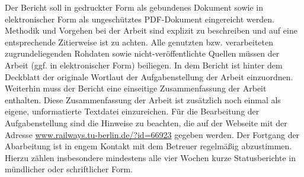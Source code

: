 Der Bericht soll in gedruckter Form als gebundenes Dokument sowie in elektronischer Form als ungeschütztes PDF-Dokument eingereicht werden. Methodik und Vorgehen bei der Arbeit sind explizit zu beschreiben und auf eine entsprechende Zitierweise ist zu achten. Alle genutzten bzw. verarbeiteten zugrundeliegenden Rohdaten sowie nicht-veröffentlichte Quellen müssen der Arbeit (ggf. in elektronischer Form) beiliegen. In dem Bericht ist hinter dem Deckblatt der originale Wortlaut der Aufgabenstellung der Arbeit einzuordnen. Weiterhin muss der Bericht eine einseitige Zusammenfassung der Arbeit enthalten. Diese Zusammenfassung der Arbeit ist zusätzlich noch einmal als eigene, unformatierte Textdatei einzureichen. Für die Bearbeitung der Aufgabenstellung sind die Hinweise zu beachten, die auf der Webseite mit der Adresse \url{www.railways.tu-berlin.de/?id=66923} gegeben werden. Der Fortgang der Abarbeitung ist in engem Kontakt mit dem Betreuer regelmäßig abzustimmen. Hierzu zählen insbesondere mindestens alle vier Wochen kurze Statusberichte in mündlicher oder schriftlicher Form.
\newpage